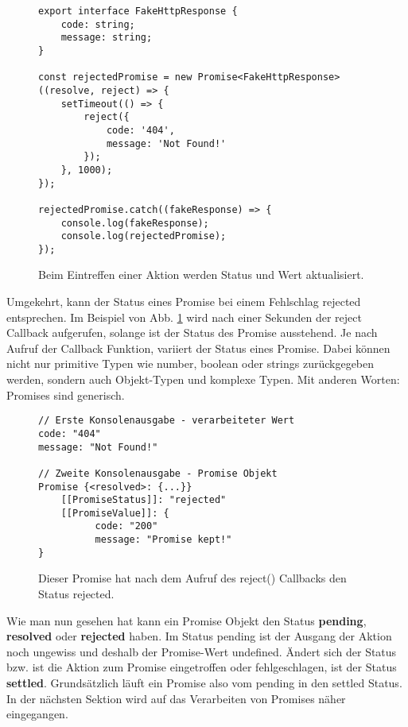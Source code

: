 \begin{figure}[H]
\begin{lstlisting}[basicstyle=\small]
export interface FakeHttpResponse {
    code: string;
    message: string;
}

const rejectedPromise = new Promise<FakeHttpResponse>((resolve, reject) => {
    setTimeout(() => {
        reject({
            code: '404',
            message: 'Not Found!'
        });
    }, 1000);
});

rejectedPromise.catch((fakeResponse) => {
    console.log(fakeResponse);
    console.log(rejectedPromise);
});
\end{lstlisting}
\caption{Beim Eintreffen einer Aktion werden Status und Wert aktualisiert.}
\label{rejected-promise}
\end{figure}

\noindent
Umgekehrt, kann der Status eines Promise bei einem Fehlschlag rejected entsprechen. Im Beispiel von Abb. \ref{rejected-promise} wird nach einer Sekunden der reject Callback aufgerufen, solange ist der Status des Promise ausstehend. Je nach Aufruf der Callback Funktion, variiert der Status eines Promise. Dabei können nicht nur primitive Typen wie number, boolean oder strings zurückgegeben werden, sondern auch Objekt-Typen und komplexe Typen. Mit anderen Worten: Promises sind generisch.

\begin{figure}[H]
\begin{lstlisting}
// Erste Konsolenausgabe - verarbeiteter Wert
code: "404"
message: "Not Found!"
    
// Zweite Konsolenausgabe - Promise Objekt
Promise {<resolved>: {...}}
    [[PromiseStatus]]: "rejected"
    [[PromiseValue]]: {
          code: "200"
          message: "Promise kept!"
}
\end{lstlisting}
\caption{Dieser Promise hat nach dem Aufruf des reject() Callbacks den Status rejected.}
\end{figure}

\noindent
Wie man nun gesehen hat kann ein Promise Objekt den Status \textbf{pending}, \textbf{resolved} oder \textbf{rejected} haben. Im Status pending ist der Ausgang der Aktion noch ungewiss und deshalb der Promise-Wert undefined. Ändert sich der Status bzw. ist die Aktion zum Promise eingetroffen oder fehlgeschlagen, ist der Status \textbf{settled}. Grundsätzlich läuft ein Promise also vom pending in den settled Status. In der nächsten Sektion wird auf das Verarbeiten von Promises näher eingegangen.


